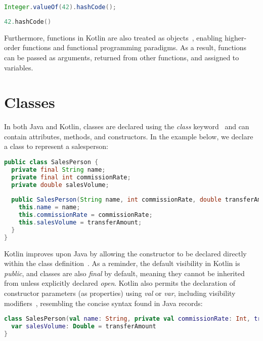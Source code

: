\documentclass[a4paper,11pt]{article}
\begin{document}
\begin{lstlisting}[language=Java, title={Java Integer Wrapper}]
Integer.valueOf(42).hashCode();
\end{lstlisting}

\begin{lstlisting}[language=Kotlin, title={Kotlin direct usage of Int}]
42.hashCode()
\end{lstlisting}

Furthermore, functions in Kotlin are also treated as objects~\cite{higher-order-functions}, enabling higher-order functions and functional programming paradigms. As a result, functions can be passed as arguments, returned from other functions, and assigned to variables.

\section{Classes}
In both Java and Kotlin, classes are declared using the \textit{class} keyword~\cite{classes} and can contain attributes, methods, and constructors. In the example below, we declare a class to represent a salesperson:

\begin{lstlisting}[language=Java, title={Java Class Declaration}]
public class SalesPerson {
  private final String name;
  private final int commissionRate;
  private double salesVolume;
  
  public SalesPerson(String name, int commissionRate, double transferAmount) {
    this.name = name;
    this.commissionRate = commissionRate;
    this.salesVolume = transferAmount;
  }
}
\end{lstlisting}
Kotlin improves upon Java by allowing the constructor to be declared directly within the class definition~\cite{classes-constructors}. As a reminder, the default visibility in Kotlin is \textit{public}, and classes are also \textit{final} by default, meaning they cannot be inherited from unless explicitly declared \textit{open}. Kotlin also permits the declaration of constructor parameters (as properties) using \textit{val} or \textit{var}, including visibility modifiers~\cite{classes-constructors}, resembling the concise syntax found in Java records:

\begin{lstlisting}[language=Kotlin,title={Kotlin Class Declaration}]
class SalesPerson(val name: String, private val commissionRate: Int, transferAmount: Double = 0.0) {
  var salesVolume: Double = transferAmount
}
\end{lstlisting}
\end{document}
